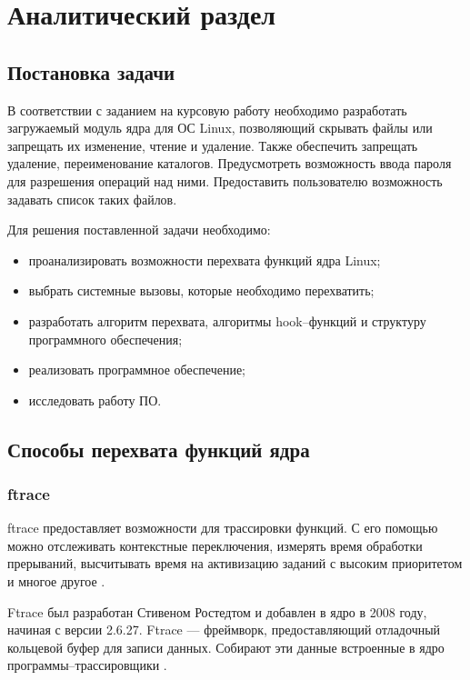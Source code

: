 \chapter{Аналитический раздел}
\label{cha:analysis}

\section{Постановка задачи}

В соответствии с заданием на курсовую работу необходимо разработать загружаемый модуль ядра для ОС Linux, позволяющий скрывать файлы или запрещать их изменение, чтение и удаление. Также обеспечить 
запрещать удаление, переименование каталогов. Предусмотреть возможность ввода пароля для разрешения операций над ними. Предоставить пользователю возможность задавать список таких файлов.

Для решения поставленной задачи необходимо:

\begin{itemize}
	\item проанализировать возможности перехвата функций ядра Linux;
	\item выбрать системные вызовы, которые необходимо перехватить;
	\item разработать алгоритм перехвата, алгоритмы hook--функций и структуру программного обеспечения;
	\item реализовать программное обеспечение;
	\item исследовать работу ПО.
\end{itemize}

\section{Способы перехвата функций ядра}

\subsection{ftrace}

ftrace предоставляет возможности для трассировки функций.  С его помощью можно отслеживать контекстные переключения, измерять время обработки прерываний, высчитывать время на активизацию заданий с высоким приоритетом и многое другое \cite{ftrace}.

Ftrace был разработан Стивеном Ростедтом и добавлен в ядро в 2008 году, начиная с версии 2.6.27. Ftrace --- фреймворк, предоставляющий отладочный кольцевой буфер для записи данных. Собирают эти данные встроенные в ядро программы--трассировщики \cite{ftrace}.


